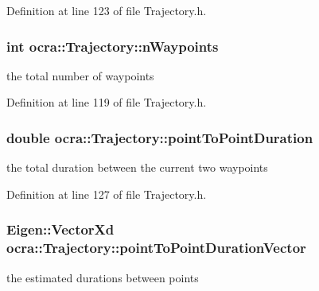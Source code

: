 Definition at line 123 of file Trajectory.\+h.

\subsubsection[{\texorpdfstring{n\+Waypoints}{nWaypoints}}]{\setlength{\rightskip}{0pt plus 5cm}int ocra\+::\+Trajectory\+::n\+Waypoints\hspace{0.3cm}{\ttfamily [protected]}}\hypertarget{classocra_1_1Trajectory_a233933b988029ac1a6ae24b58e59bf3e}{}\label{classocra_1_1Trajectory_a233933b988029ac1a6ae24b58e59bf3e}
the total number of waypoints 

Definition at line 119 of file Trajectory.\+h.

\subsubsection[{\texorpdfstring{point\+To\+Point\+Duration}{pointToPointDuration}}]{\setlength{\rightskip}{0pt plus 5cm}double ocra\+::\+Trajectory\+::point\+To\+Point\+Duration\hspace{0.3cm}{\ttfamily [protected]}}\hypertarget{classocra_1_1Trajectory_a7601711560c35d3096ed541708cce691}{}\label{classocra_1_1Trajectory_a7601711560c35d3096ed541708cce691}
the total duration between the current two waypoints 

Definition at line 127 of file Trajectory.\+h.

\subsubsection[{\texorpdfstring{point\+To\+Point\+Duration\+Vector}{pointToPointDurationVector}}]{\setlength{\rightskip}{0pt plus 5cm}Eigen\+::\+Vector\+Xd ocra\+::\+Trajectory\+::point\+To\+Point\+Duration\+Vector\hspace{0.3cm}{\ttfamily [protected]}}\hypertarget{classocra_1_1Trajectory_ad00d173bd78dc9ff365736e751fa3ef8}{}\label{classocra_1_1Trajectory_ad00d173bd78dc9ff365736e751fa3ef8}
the estimated durations between points 

